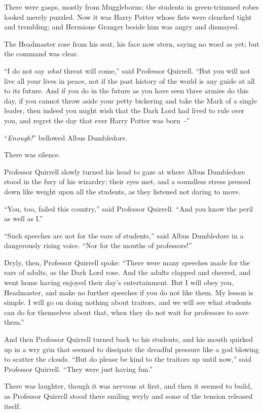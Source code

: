 There were gasps, mostly from Muggleborns; the students in green-trimmed robes looked merely puzzled. Now it was Harry Potter whose fists were clenched tight and trembling; and Hermione Granger beside him was angry and dismayed.

The Headmaster rose from his seat, his face now stern, saying no word as yet; but the command was clear.

``I do not say \emph{what} threat will come,'' said Professor Quirrell. ``But you will not live all your lives in peace, not if the past history of the world is any guide at all to its future. And if you do in the future as you have seen three armies do this day, if you cannot throw aside your petty bickering and take the Mark of a single leader, then indeed you might wish that the Dark Lord had lived to rule over you, and regret the day that ever Harry Potter was born~-''

``\emph{Enough!}'' bellowed Albus Dumbledore.

There was silence.

Professor Quirrell slowly turned his head to gaze at where Albus Dumbledore stood in the fury of his wizardry; their eyes met, and a soundless stress pressed down like weight upon all the students, as they listened not daring to move.

``You, too, failed this country,'' said Professor Quirrell. ``And you know the peril as well as I.''

``Such speeches are not for the ears of students,'' said Albus Dumbledore in a dangerously rising voice. ``Nor for the mouths of professors!''

Dryly, then, Professor Quirrell spoke: ``There were many speeches made for the ears of adults, as the Dark Lord rose. And the adults clapped and cheered, and went home having enjoyed their day's entertainment. But I will obey you, Headmaster, and make no further speeches if you do not like them. My lesson is simple. I will go on doing nothing about traitors, and we will see what students can do for themselves about that, when they do not wait for professors to save them.''

And then Professor Quirrell turned back to his students, and his mouth quirked up in a wry grin that seemed to dissipate the dreadful pressure like a god blowing to scatter the clouds. ``But do please be kind to the traitors up until now,'' said Professor Quirrell. ``They were just having fun.''

There was laughter, though it was nervous at first, and then it seemed to build, as Professor Quirrell stood there smiling wryly and some of the tension released itself.

